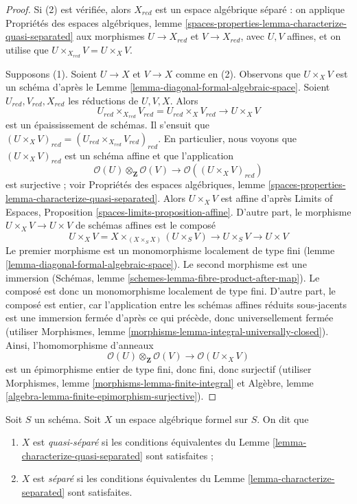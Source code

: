 \begin{proof}
Si (2) est vérifiée, alors $X_{red}$ est un espace algébrique séparé : on applique
Propriétés des espaces algébriques, lemme
\ref{spaces-properties-lemma-characterize-quasi-separated}
aux morphismes $U \to X_{red}$ et $V \to X_{red}$,
avec $U, V$ affines, et on utilise que $U \times_{X_{red}} V = U \times_X V$.

\medskip\noindent
Supposons (1). Soient $U \to X$ et $V \to X$ comme en (2).
Observons que $U \times_X V$ est un schéma d'après le
Lemme \ref{lemma-diagonal-formal-algebraic-space}.
Soient $U_{red}, V_{red}, X_{red}$ les réductions de $U, V, X$.
Alors
$$
U_{red} \times_{X_{red}} V_{red} = U_{red} \times_X V_{red} \to U \times_X V
$$
est un épaississement de schémas. Il s'ensuit que
$(U \times_X V)_{red} = (U_{red} \times_{X_{red}} V_{red})_{red}$.
En particulier, nous voyons que $(U \times_X V)_{red}$ est un schéma affine
et que l'application
$$
\mathcal{O}(U) \otimes_\mathbf{Z} \mathcal{O}(V)
\longrightarrow
\mathcal{O}((U \times_X V)_{red})
$$
est surjective ; voir Propriétés des espaces algébriques, lemme
\ref{spaces-properties-lemma-characterize-quasi-separated}.
Alors $U \times_X V$ est affine d'après
Limits of Espaces, Proposition \ref{spaces-limits-proposition-affine}.
D'autre part, le morphisme $U \times_X V \to U \times V$
de schémas affines est le composé
$$
U \times_X V = X \times_{(X \times_S X)} (U \times_S V)
\to U \times_S V \to U \times V
$$
Le premier morphisme est un monomorphisme localement de type fini
(lemme \ref{lemma-diagonal-formal-algebraic-space}).
Le second morphisme est une immersion
(Schémas, lemme \ref{schemes-lemma-fibre-product-after-map}).
Le composé est donc un monomorphisme localement de type fini.
D'autre part, le composé est entier, car l'application entre les schémas
affines réduits sous-jacents est une immersion fermée
d'après ce qui précède, donc universellement fermée (utiliser
Morphismes, lemme \ref{morphisms-lemma-integral-universally-closed}).
Ainsi, l'homomorphisme d'anneaux
$$
\mathcal{O}(U) \otimes_\mathbf{Z} \mathcal{O}(V)
\longrightarrow
\mathcal{O}(U \times_X V)
$$
est un épimorphisme entier de type fini,
donc fini, donc surjectif (utiliser
Morphismes, lemme \ref{morphisms-lemma-finite-integral}
et
Algèbre, lemme \ref{algebra-lemma-finite-epimorphism-surjective}).
\end{proof}

\begin{definition}
\label{definition-separated}
Soit $S$ un schéma. Soit $X$ un espace algébrique formel sur $S$.
On dit que
\begin{enumerate}
\item $X$ est {\it quasi-séparé} si les conditions équivalentes du
Lemme \ref{lemma-characterize-quasi-separated} sont satisfaites ;
\item $X$ est {\it séparé} si les conditions équivalentes du
Lemme \ref{lemma-characterize-separated} sont satisfaites.
\end{enumerate}
\end{definition}

